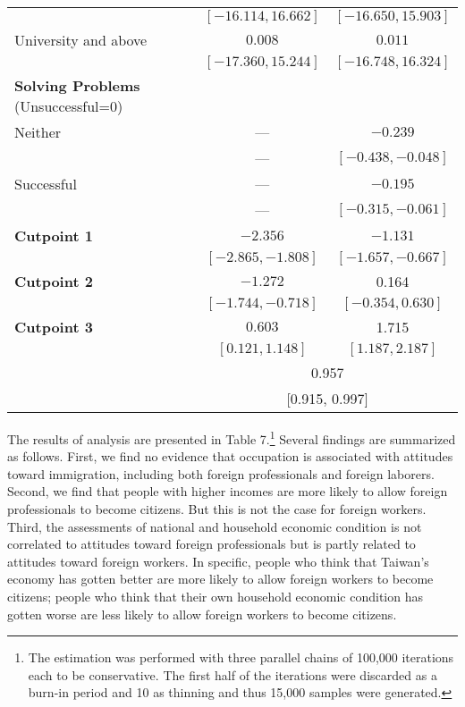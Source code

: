 \documentclass[12pt]{article}
\begin{document}
\begin{center}
{\begin{longtable}{l|cc}
           & $[-16.114, 16.662]$   & $[-16.650, 15.903]$    \\  
University and above  & $0.008$        & $0.011$         \\
          & $[-17.360, 15.244]$   & $[-16.748, 16.324]$    \\  
\textbf{Solving Problems} (Unsuccessful=0)   &               &            \\
Neither         & ---                & $-0.239$               \\
            & ---   & $[-0.438, -0.048]$     \\
Successful   & ---                & $-0.195$                  \\
           & ---   & $[-0.315, -0.061]$    \\
\hline
\textbf{Cutpoint 1}  & $-2.356$                & $-1.131$          \\
          & $[-2.865, -1.808]$   & $[-1.657, -0.667]$       \\
\textbf{Cutpoint 2}  & $-1.272$                & 0.164          \\
          & $[-1.744, -0.718]$   & $[-0.354, 0.630]$       \\
\textbf{Cutpoint 3}  & $0.603$                & 1.715          \\
          & $[0.121, 1.148]$   & $[1.187, 2.187]$       \\
\hline
\bm{$\rho$}           & \multicolumn{2}{c}{0.957}              \\
                      & \multicolumn{2}{c}{[0.915, 0.997]} 
\label{table6}
\end{longtable}
}
\endgroup
\end{center}



The results of analysis are presented in Table 7.\footnote{The estimation was performed with three parallel chains of 100,000 iterations each to be conservative. The first half of the iterations were discarded as a burn-in period and 10 as thinning and thus 15,000 samples were generated.} Several findings are summarized as follows. First, we find no evidence that occupation is associated with attitudes toward immigration, including both foreign professionals and foreign laborers. Second, we find that people with higher incomes are more likely to allow foreign professionals to become citizens. But this is not the case for foreign workers. Third, the assessments of national and household economic condition is not correlated to attitudes toward foreign professionals but is partly related to attitudes toward foreign workers. In specific, people who think that Taiwan's economy has gotten better are more likely to allow foreign workers to become citizens; people who think that their own household economic condition has gotten worse are less likely to allow foreign workers to become citizens. 
\end{document}

